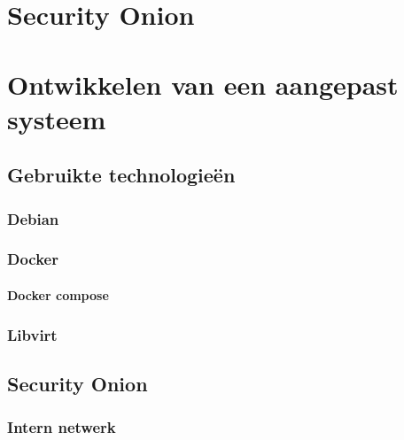 \documentclass[a4paper,12pt]{report}
\begin{document}
\chapter{Security Onion}

\chapter{Ontwikkelen van een aangepast systeem}
\section{Gebruikte technologie\"en}
\subsection{Debian}
\subsection{Docker}
\subsubsection{Docker compose}
\subsection{Libvirt}

\section{Security Onion}
\subsection{Intern netwerk}
\end{document}
